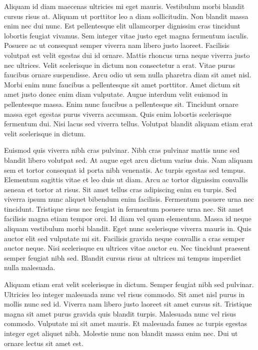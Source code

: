 \documentclass[11pt,a4paper]{article}
\begin{document}
Aliquam id diam maecenas ultricies mi eget mauris. Vestibulum morbi blandit cursus risus at. Aliquam ut porttitor leo a diam sollicitudin. Non blandit massa enim nec dui nunc. Est pellentesque elit ullamcorper dignissim cras tincidunt lobortis feugiat vivamus. Sem integer vitae justo eget magna fermentum iaculis. Posuere ac ut consequat semper viverra nam libero justo laoreet. Facilisis volutpat est velit egestas dui id ornare. Mattis rhoncus urna neque viverra justo nec ultrices. Velit scelerisque in dictum non consectetur a erat. Vitae purus faucibus ornare suspendisse. Arcu odio ut sem nulla pharetra diam sit amet nisl. Morbi enim nunc faucibus a pellentesque sit amet porttitor. Amet dictum sit amet justo donec enim diam vulputate. Augue interdum velit euismod in pellentesque massa. Enim nunc faucibus a pellentesque sit. Tincidunt ornare massa eget egestas purus viverra accumsan. Quis enim lobortis scelerisque fermentum dui. Nisi lacus sed viverra tellus. Volutpat blandit aliquam etiam erat velit scelerisque in dictum.

Euismod quis viverra nibh cras pulvinar. Nibh cras pulvinar mattis nunc sed blandit libero volutpat sed. At augue eget arcu dictum varius duis. Nam aliquam sem et tortor consequat id porta nibh venenatis. Ac turpis egestas sed tempus. Elementum sagittis vitae et leo duis ut diam. Arcu ac tortor dignissim convallis aenean et tortor at risus. Sit amet tellus cras adipiscing enim eu turpis. Sed viverra ipsum nunc aliquet bibendum enim facilisis. Fermentum posuere urna nec tincidunt. Tristique risus nec feugiat in fermentum posuere urna nec. Sit amet facilisis magna etiam tempor orci. Id diam vel quam elementum. Massa id neque aliquam vestibulum morbi blandit. Eget nunc scelerisque viverra mauris in. Quis auctor elit sed vulputate mi sit. Facilisis gravida neque convallis a cras semper auctor neque. Nisi scelerisque eu ultrices vitae auctor eu. Nec tincidunt praesent semper feugiat nibh sed. Blandit cursus risus at ultrices mi tempus imperdiet nulla malesuada.

Aliquam etiam erat velit scelerisque in dictum. Semper feugiat nibh sed pulvinar. Ultricies leo integer malesuada nunc vel risus commodo. Sit amet nisl purus in mollis nunc sed id. Viverra nam libero justo laoreet sit amet cursus sit. Tristique magna sit amet purus gravida quis blandit turpis. Malesuada nunc vel risus commodo. Vulputate mi sit amet mauris. Et malesuada fames ac turpis egestas integer eget aliquet nibh. Molestie nunc non blandit massa enim nec. Dui ut ornare lectus sit amet est.
\end{document}

